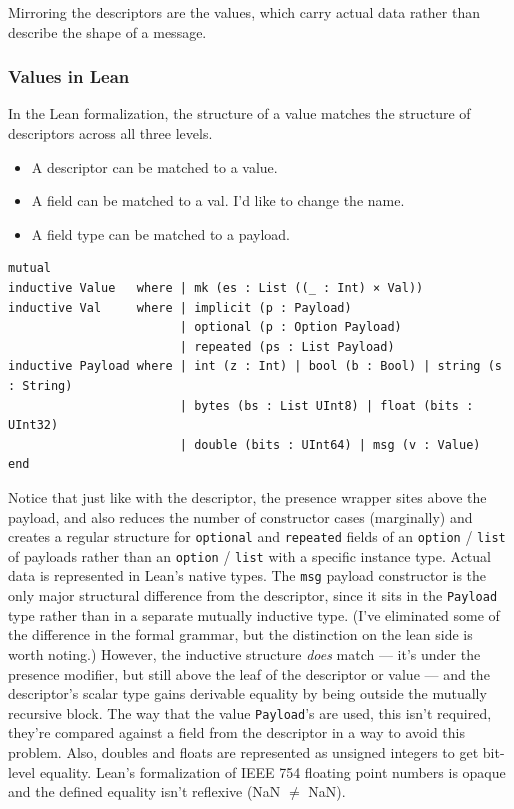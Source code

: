 Mirroring the descriptors are the values, which carry actual data rather than
describe the shape of a message.

\subsubsection{Values in Lean}

In the Lean formalization, the structure of a value matches the structure of
descriptors across all three levels.

\begin{itemize}
\item A descriptor can be matched to a value.
\item A field can be matched to a val. {\color{red} I'd like to change the
    name.}
\item A field type can be matched to a payload.
\end{itemize}

\begin{verbatim}
mutual
inductive Value   where | mk (es : List ((_ : Int) × Val))
inductive Val     where | implicit (p : Payload)
                        | optional (p : Option Payload)
                        | repeated (ps : List Payload)
inductive Payload where | int (z : Int) | bool (b : Bool) | string (s : String)
                        | bytes (bs : List UInt8) | float (bits : UInt32)
                        | double (bits : UInt64) | msg (v : Value)
end
\end{verbatim}

Notice that just like with the descriptor, the presence wrapper sites above the
payload, and also reduces the number of constructor cases (marginally) and
creates a regular structure for \texttt{optional} and \texttt{repeated} fields
of an \texttt{option} / \texttt{list} of payloads rather than an \texttt{option}
/ \texttt{list} with a specific instance type. Actual data is represented in
Lean's native types. The \texttt{msg} payload constructor is the only major
structural difference from the descriptor, since it sits in the \texttt{Payload}
type rather than in a separate mutually inductive type. (I've eliminated some of
the difference in the formal grammar, but the distinction on the lean side is
worth noting.) However, the inductive structure \emph{does} match --- it's
under the presence modifier, but still above the leaf of the descriptor or value
--- and the descriptor's scalar type gains derivable equality by being outside the
mutually recursive block. The way that the value \texttt{Payload}'s are used,
this isn't required, they're compared against a field from the descriptor in a
way to avoid this problem. Also, doubles and floats are represented as unsigned
integers to get bit-level equality. Lean's formalization of IEEE 754 floating
point numbers is opaque and the defined equality isn't reflexive (NaN $\ne$ NaN). 

